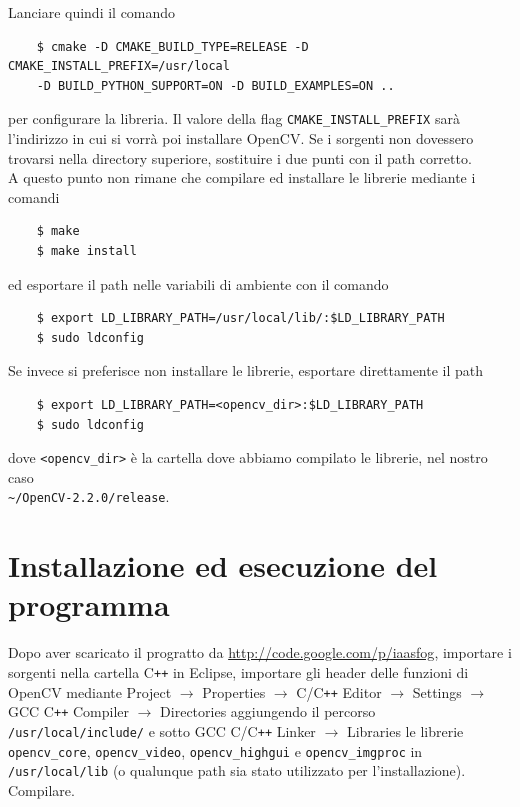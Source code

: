 \documentclass[12pt]{report}
\begin{document}
\noindent Lanciare quindi il comando

\begin{verbatim}
	$ cmake -D CMAKE_BUILD_TYPE=RELEASE -D CMAKE_INSTALL_PREFIX=/usr/local
	-D BUILD_PYTHON_SUPPORT=ON -D BUILD_EXAMPLES=ON ..
\end{verbatim}

\noindent per configurare la libreria. Il valore della flag \verb|CMAKE_INSTALL_PREFIX| sar\`a l'indirizzo in cui si vorr\`a poi installare OpenCV. Se i sorgenti non dovessero trovarsi nella directory superiore, sostituire i due punti con il path corretto.\\

\noindent A questo punto non rimane che compilare ed installare le librerie mediante i comandi

\begin{verbatim}
	$ make
	$ make install
\end{verbatim}

\noindent ed esportare il path nelle variabili di ambiente con il comando

\begin{verbatim}
	$ export LD_LIBRARY_PATH=/usr/local/lib/:$LD_LIBRARY_PATH
	$ sudo ldconfig
\end{verbatim}

\noindent Se invece si preferisce non installare le librerie, esportare direttamente il path 

\begin{verbatim}
	$ export LD_LIBRARY_PATH=<opencv_dir>:$LD_LIBRARY_PATH
	$ sudo ldconfig
\end{verbatim}

\noindent dove \verb|<opencv_dir>| \`e la cartella dove abbiamo compilato le librerie, nel nostro caso\\ \verb|~/OpenCV-2.2.0/release|.

\section{Installazione ed esecuzione del programma}

\noindent Dopo aver scaricato il progratto da \url{http://code.google.com/p/iaasfog}, importare i sorgenti nella cartella C\verb|++| in Eclipse, importare gli header delle funzioni di OpenCV mediante Project $\rightarrow$ Properties  $\rightarrow$ C\slash C\verb|++| Editor $\rightarrow$ Settings $\rightarrow$ GCC C\verb|++| Compiler $\rightarrow$ Directories aggiungendo il percorso \verb|/usr/local/include/| e sotto GCC C\slash C\verb|++| Linker $\rightarrow$ Libraries le librerie \verb|opencv_core|, \verb|opencv_video|, \verb|opencv_highgui| e \verb|opencv_imgproc| in \verb|/usr/local/lib| (o qualunque path sia stato utilizzato per l'installazione).\\
Compilare.\\
\end{document}

